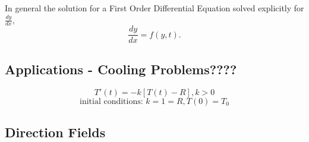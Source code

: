 \documentclass[10pt]{article}
\begin{document}
    In general the solution for a First Order Differential Equation solved explicitly for $\frac{dy}{dx}$, $$\frac{dy}{dx}=f(y,t).$$
    
    \subsection{Applications - Cooling Problems????}
    
    $$T'(t)=-k[T(t)-R], k>0$$
    $$\text{initial conditions:  } k=1=R, T(0)=T_0$$

    \newpage
    
    \subsection{Direction Fields}
    
\end{document}
